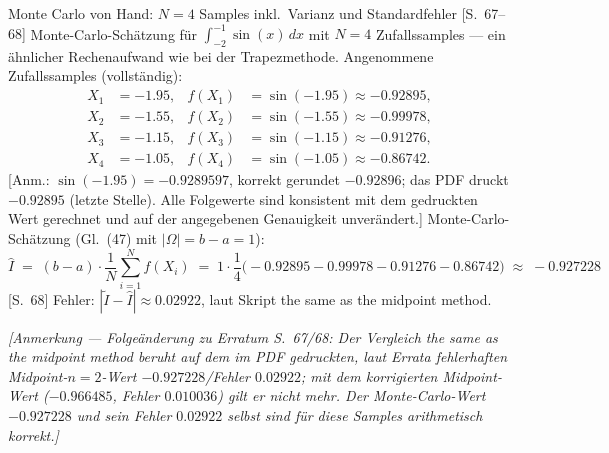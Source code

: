 \begin{bspbox}{Monte Carlo von Hand: $N = 4$ Samples inkl.\ Varianz und Standardfehler [S.~67--68]}
Monte-Carlo-Schätzung für $\int_{-2}^{-1}\sin(x)\,dx$ mit $N = 4$ Zufallssamples ---
ein ähnlicher Rechenaufwand wie bei der Trapezmethode. Angenommene Zufallssamples
(vollständig):
\begin{align*}
  X_1 &= -1.95, & f(X_1) &= \sin(-1.95) \approx -0.92895,\\
  X_2 &= -1.55, & f(X_2) &= \sin(-1.55) \approx -0.99978,\\
  X_3 &= -1.15, & f(X_3) &= \sin(-1.15) \approx -0.91276,\\
  X_4 &= -1.05, & f(X_4) &= \sin(-1.05) \approx -0.86742.
\end{align*}
[Anm.: $\sin(-1.95) = -0.9289597$, korrekt gerundet $-0.92896$; das PDF druckt $-0.92895$ (letzte Stelle). Alle Folgewerte sind konsistent mit dem gedruckten Wert gerechnet und auf der angegebenen Genauigkeit unverändert.]
Monte-Carlo-Schätzung (Gl.~(47) mit $|\Omega| = b - a = 1$):
\[
  \hat{I} \;=\; (b-a)\cdot\frac{1}{N}\sum_{i=1}^N f(X_i)
  \;=\; 1\cdot\frac{1}{4}\bigl(-0.92895 - 0.99978 - 0.91276 - 0.86742\bigr)
  \;\approx\; -0.927228
\]
[S.~68] Fehler: $|\tilde{I} - \hat{I}| \approx 0.02922$, laut Skript \glqq the same
as the midpoint method\grqq.

\emph{[Anmerkung --- Folgeänderung zu Erratum S.~67/68: Der Vergleich \glqq the
same as the midpoint method\grqq{} beruht auf dem im PDF gedruckten, laut Errata
fehlerhaften Midpoint-$n{=}2$-Wert $-0.927228$/Fehler $0.02922$; mit dem
korrigierten Midpoint-Wert ($-0.966485$, Fehler $0.010036$) gilt er nicht mehr.
Der Monte-Carlo-Wert $-0.927228$ und sein Fehler $0.02922$ selbst sind für diese
Samples arithmetisch korrekt.]}


\end{bspbox}
